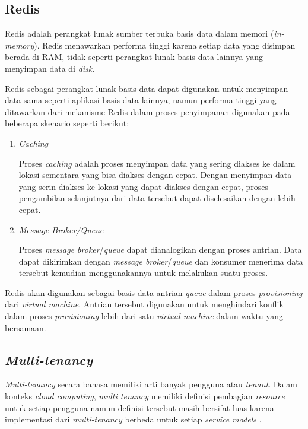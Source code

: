 \subsection{Redis}
\label{sec:redis}

Redis adalah perangkat lunak sumber terbuka basis data dalam memori (\emph{in-memory}).
Redis menawarkan performa tinggi karena setiap data yang disimpan berada di RAM, tidak seperti
perangkat lunak basis data lainnya yang menyimpan data di \emph{disk}.

Redis sebagai perangkat lunak basis data dapat digunakan untuk menyimpan data sama seperti
aplikasi basis data lainnya, namun performa tinggi yang ditawarkan 
dari mekanisme Redis dalam proses penyimpanan digunakan pada beberapa skenario
seperti berikut:

\begin{enumerate}

  \item \emph{Caching}
    
    Proses \emph{caching} adalah proses menyimpan data yang sering diakses ke dalam
    lokasi sementara yang bisa diakses dengan cepat. Dengan menyimpan data yang serin
    diakses ke lokasi yang dapat diakses dengan cepat, proses pengambilan selanjutnya
    dari data tersebut dapat diselesaikan dengan lebih cepat.

  \item \emph{Message Broker/Queue}

    Proses \emph{message broker}/\emph{queue} dapat dianalogikan dengan proses antrian.
    Data dapat dikirimkan dengan \emph{message broker}/\emph{queue} dan konsumer menerima
    data tersebut kemudian menggunakannya untuk melakukan suatu proses.

\end{enumerate}

Redis akan digunakan sebagai basis data antrian \emph{queue} dalam proses \emph{provisioning} dari
\emph{virtual machine}. Antrian tersebut digunakan untuk menghindari konflik dalam proses \emph{provisioning}
lebih dari satu \emph{virtual machine} dalam waktu yang bersamaan.

\subsection{\emph{Multi-tenancy}}
\label{sec:multi-tenancy}

\emph{Multi-tenancy} secara bahasa memiliki arti banyak pengguna atau \emph{tenant}. Dalam konteks
\emph{cloud computing}, \emph{multi tenancy} memiliki definisi pembagian \emph{resource} 
untuk setiap pengguna namun definisi tersebut masih bersifat luas karena implementasi
dari \emph{multi-tenancy} berbeda untuk setiap \emph{service models} \parencite{6830928}.

